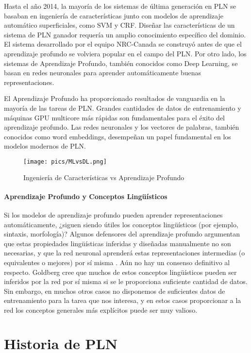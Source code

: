 Hasta el año 2014, la mayoría de los sistemas de última generación en PLN se basaban en ingeniería de características junto con modelos de aprendizaje automático superficiales, como SVM y CRF. Diseñar las características de un sistema de PLN ganador requería un amplio conocimiento específico del dominio. El sistema desarrollado por el equipo NRC-Canada se construyó antes de que el aprendizaje profundo se volviera popular en el campo del PLN. Por otro lado, los sistemas de Aprendizaje Profundo, también conocidos como Deep Learning, se basan en redes neuronales para aprender automáticamente buenas representaciones.

El Aprendizaje Profundo ha proporcionado resultados de vanguardia en la mayoría de las tareas de PLN. Grandes cantidades de datos de entrenamiento y máquinas GPU multicore más rápidas son fundamentales para el éxito del aprendizaje profundo. Las redes neuronales y los vectores de palabras, también conocidos como word embeddings, desempeñan un papel fundamental en los modelos modernos de PLN.

\begin{figure}[h]
	\centering
	\texttt{[image: pics/MLvsDL.png]}
	\caption{Ingeniería de Características vs Aprendizaje Profundo}
	\label{fig:MLvsDL}
\end{figure}


\paragraph{Aprendizaje Profundo y Conceptos Lingüísticos}
Si los modelos de aprendizaje profundo pueden aprender representaciones automáticamente, ¿siguen siendo útiles los conceptos lingüísticos (por ejemplo, sintaxis, morfología)? Algunos defensores del aprendizaje profundo argumentan que estas propiedades lingüísticas inferidas y diseñadas manualmente no son necesarias, y que la red neuronal aprenderá estas representaciones intermedias (o equivalentes o mejores) por sí misma \cite{goldberg2016primer}. Aún no hay un consenso definitivo al respecto. Goldberg cree que muchos de estos conceptos lingüísticos pueden ser inferidos por la red por sí misma si se le proporciona suficiente cantidad de datos. Sin embargo, en muchos otros casos no disponemos de suficientes datos de entrenamiento para la tarea que nos interesa, y en estos casos proporcionar a la red los conceptos generales más explícitos puede ser muy valioso.

\section{Historia de PLN}

